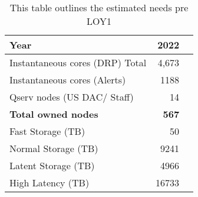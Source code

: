 \tiny \begin{longtable} { |p{}  |r  |r |} 
\caption{This table outlines the estimated needs pre LOY1  \label{tab:foa22}}\\ 
\hline 
\textbf{Year}&\textbf{2022} \\ \hline
{Instantaneous cores (DRP) Total}&{4,673} \\ \hline
{Instantaneous cores (Alerts)}&{1188} \\ \hline
{Qserv nodes (US DAC/ Staff)}&{14} \\ \hline
\textbf{Total owned nodes}&\textbf{567} \\ \hline
{Fast Storage (TB)}&{50} \\ \hline
{Normal Storage (TB)}&{9241} \\ \hline
{Latent Storage  (TB)}&{4966} \\ \hline
{High Latency (TB)}&{16733} \\ \hline
\end{longtable} \normalsize
